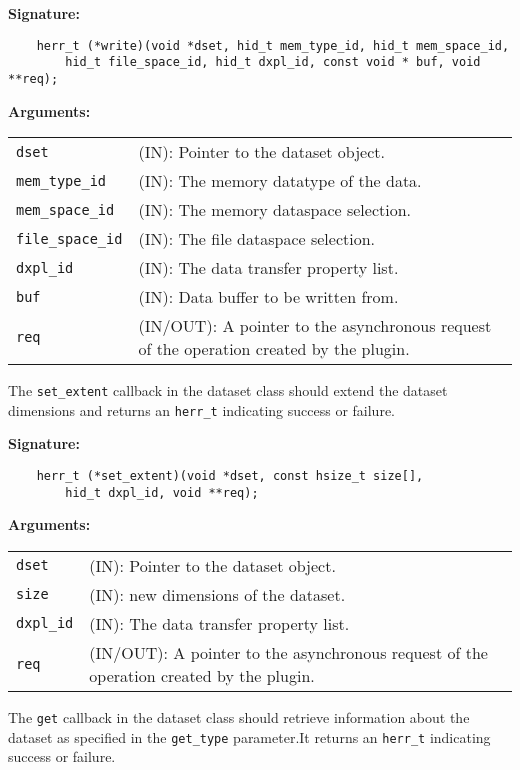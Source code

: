 \textbf{Signature:}
\begin{lstlisting}
    herr_t (*write)(void *dset, hid_t mem_type_id, hid_t mem_space_id, 
        hid_t file_space_id, hid_t dxpl_id, const void * buf, void **req);
\end{lstlisting}

\textbf{Arguments:}\\
\begin{tabular}{l p{10cm}}
  {\tt dset} & (IN): Pointer to the dataset object.\\
  {\tt mem\_type\_id} & (IN): The memory datatype of the data.\\
  {\tt mem\_space\_id} & (IN): The memory dataspace selection.\\
  {\tt file\_space\_id} & (IN): The file dataspace selection.\\
  {\tt dxpl\_id} & (IN): The data transfer property list.\\
  {\tt buf} & (IN): Data buffer to be written from.\\
  {\tt req} & (IN/OUT): A pointer to the asynchronous request of the
  operation created by the plugin.\\
\end{tabular}

The {\tt set\_extent} callback in the dataset class should extend the
dataset dimensions and returns an {\tt herr\_t} indicating success or
failure.

\textbf{Signature:}
\begin{lstlisting}
    herr_t (*set_extent)(void *dset, const hsize_t size[], 
        hid_t dxpl_id, void **req);
\end{lstlisting}

\textbf{Arguments:}\\
\begin{tabular}{l p{10cm}}
  {\tt dset} & (IN): Pointer to the dataset object.\\
  {\tt size} & (IN): new dimensions of the dataset.\\
  {\tt dxpl\_id} & (IN): The data transfer property list.\\
  {\tt req} & (IN/OUT): A pointer to the asynchronous request of the
  operation created by the plugin.\\
\end{tabular}

The {\tt get} callback in the dataset class should retrieve
information about the dataset as specified in the {\tt get\_type}
parameter.It returns an {\tt herr\_t} indicating success or failure.

